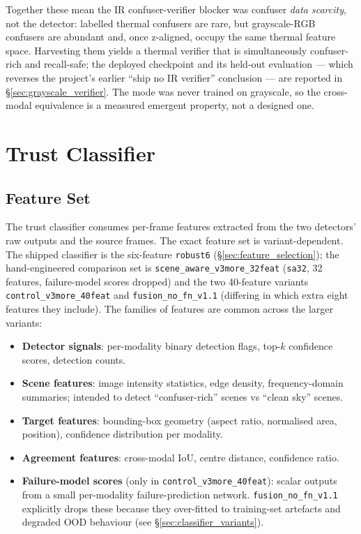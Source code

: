 \documentclass[12pt,a4paper,oneside,openright]{book}
\begin{document}
Together these mean the IR confuser-verifier blocker was confuser \emph{data scarcity}, not the detector: labelled thermal confusers are rare, but grayscale-RGB confusers are abundant and, once z-aligned, occupy the same thermal feature space. Harvesting them yields a thermal verifier that is simultaneously confuser-rich and recall-safe; the deployed checkpoint and its held-out evaluation --- which reverses the project's earlier ``ship no IR verifier'' conclusion --- are reported in \S\ref{sec:grayscale_verifier}. The mode was never trained on grayscale, so the cross-modal equivalence is a measured emergent property, not a designed one.

\section{Trust Classifier}
\label{sec:trust_classifier}

\subsection{Feature Set}

The trust classifier consumes per-frame features extracted from the two detectors' raw outputs and the source frames. The exact feature set is variant-dependent. The shipped classifier is the six-feature \texttt{robust6} (\S\ref{sec:feature_selection}); the hand-engineered comparison set is \texttt{scene\_aware\_v3more\_32feat} (\texttt{sa32}, 32 features, failure-model scores dropped) and the two 40-feature variants \texttt{control\_v3more\_40feat} and \texttt{fusion\_no\_fn\_v1.1} (differing in which extra eight features they include). The families of features are common across the larger variants:

\begin{itemize}
    \item \textbf{Detector signals}: per-modality binary detection flags, top-$k$ confidence scores, detection counts.
    \item \textbf{Scene features}: image intensity statistics, edge density, frequency-domain summaries; intended to detect ``confuser-rich'' scenes vs ``clean sky'' scenes.
    \item \textbf{Target features}: bounding-box geometry (aspect ratio, normalised area, position), confidence distribution per modality.
    \item \textbf{Agreement features}: cross-modal IoU, centre distance, confidence ratio.
    \item \textbf{Failure-model scores} (only in \texttt{control\_v3more\_40feat}): scalar outputs from a small per-modality failure-prediction network. \texttt{fusion\_no\_fn\_v1.1} explicitly drops these because they over-fitted to training-set artefacts and degraded OOD behaviour (see \S\ref{sec:classifier_variants}).
\end{itemize}
\end{document}
